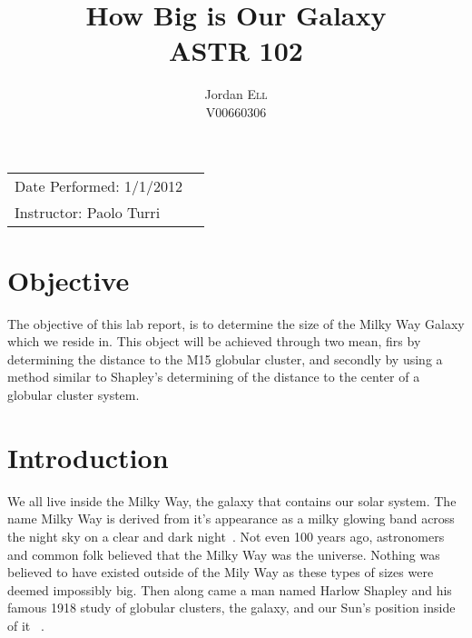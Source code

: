 \documentclass{article}
\title{How Big is Our Galaxy \\ ASTR 102} %
\author{Jordan \textsc{Ell} \\ V00660306} %
\begin{document}
\maketitle %

\begin{tabular}{lr}
Date Performed: 1/1/2012\\ %
Instructor: Paolo Turri %
\end{tabular}

\setlength\parindent{0pt} %

\renewcommand{\labelenumi}{\alph{enumi}.} %


\section{Objective}

The objective of this lab report, is to determine the size of the Milky Way Galaxy which
we reside in. This object will be achieved through two mean, firs by determining the 
distance to the M15 globular cluster, and secondly by using a method similar to Shapley's
determining of the distance to the center of a globular cluster system.
 

\section{Introduction}

We all live inside the Milky Way, the galaxy that contains our solar system. The name
Milky Way is derived from it's appearance as a milky glowing band across the night
sky on a clear and dark night~\cite{encyc:2012}. Not even 100 years ago, astronomers
and common folk believed that the Milky Way was the universe. Nothing was believed
to have existed outside of the Mily Way as these types of sizes were deemed 
impossibly big. Then along came a man named Harlow Shapley and his famous 1918
study of globular clusters, the galaxy, and our Sun's position inside of it
~\cite{Bart:1972}. \\
\end{document}

